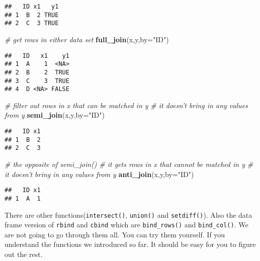\documentclass[
]{article}
\newenvironment{Shaded}{\begin{snugshade}}{\end{snugshade}}
\newcommand{\CommentTok}[1]{\textcolor[rgb]{0.56,0.35,0.01}{\textit{#1}}}
\newcommand{\DataTypeTok}[1]{\textcolor[rgb]{0.13,0.29,0.53}{#1}}
\newcommand{\KeywordTok}[1]{\textcolor[rgb]{0.13,0.29,0.53}{\textbf{#1}}}
\newcommand{\NormalTok}[1]{#1}
\newcommand{\StringTok}[1]{\textcolor[rgb]{0.31,0.60,0.02}{#1}}
\begin{document}
\begin{verbatim}
##   ID x1   y1
## 1  B  2 TRUE
## 2  C  3 TRUE
\end{verbatim}

\begin{Shaded}
\begin{Highlighting}[]
\CommentTok{# get rows in either data set}
\KeywordTok{full_join}\NormalTok{(x,y,}\DataTypeTok{by=}\StringTok{"ID"}\NormalTok{)}
\end{Highlighting}
\end{Shaded}

\begin{verbatim}
##   ID   x1    y1
## 1  A    1  <NA>
## 2  B    2  TRUE
## 3  C    3  TRUE
## 4  D <NA> FALSE
\end{verbatim}

\begin{Shaded}
\begin{Highlighting}[]
\CommentTok{# filter out rows in x that can be matched in y }
\CommentTok{# it doesn't bring in any values from y }
\KeywordTok{semi_join}\NormalTok{(x,y,}\DataTypeTok{by=}\StringTok{"ID"}\NormalTok{)}
\end{Highlighting}
\end{Shaded}

\begin{verbatim}
##   ID x1
## 1  B  2
## 2  C  3
\end{verbatim}

\begin{Shaded}
\begin{Highlighting}[]
\CommentTok{# the opposite of  semi_join()}
\CommentTok{# it gets rows in x that cannot be matched in y}
\CommentTok{# it doesn't bring in any values from y}
\KeywordTok{anti_join}\NormalTok{(x,y,}\DataTypeTok{by=}\StringTok{"ID"}\NormalTok{)}
\end{Highlighting}
\end{Shaded}

\begin{verbatim}
##   ID x1
## 1  A  1
\end{verbatim}

There are other functions(\texttt{intersect()}, \texttt{union()} and
\texttt{setdiff()}). Also the data frame version of \texttt{rbind} and
\texttt{cbind} which are \texttt{bind\_rows()} and \texttt{bind\_col()}.
We are not going to go through them all. You can try them yourself. If
you understand the functions we introduced so far. It should be easy for
you to figure out the rest.
\end{document}
